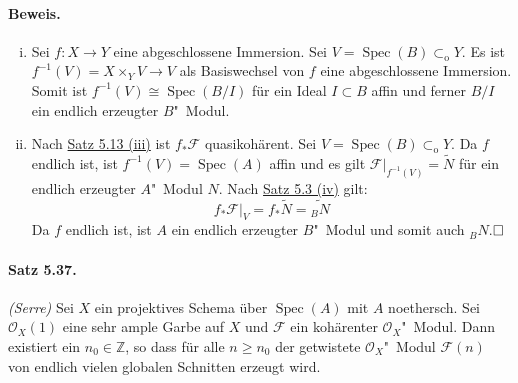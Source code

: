\documentclass[11pt,b5paper,openany]{memoir}
\def \qed {$\hfill\square$}
\begin{document}
\paragraph{Beweis.}\begin{enumerate}[(i)]
\item Sei $f:X\to Y$ eine abgeschlossene Immersion. Sei $V=\operatorname{Spec}(B)\subset_\text{o}Y$. Es ist $f^{-1}(V)=X\times_YV\to V$ als Basiswechsel von $f$ eine abgeschlossene Immersion. Somit ist $f^{-1}(V)\cong\operatorname{Spec}(B/I)$ für ein Ideal $I\subset B$ affin und ferner $B/I$ ein endlich erzeugter $B$"~Modul.
\item Nach \hyperref[5.13]{Satz 5.13 (iii)} ist $f_\ast\mathcal{F}$ quasikohärent. Sei $V=\operatorname{Spec}(B)\subset_\text{o}Y$. Da $f$ endlich ist, ist $f^{-1}(V)=\operatorname{Spec}(A)$ affin und es gilt $\mathcal{F}|_{f^{-1}(V)}=\widetilde{N}$ für ein endlich erzeugter $A$"~Modul $N$. Nach \hyperref[5.3]{Satz 5.3 (iv)} gilt:
\[f_\ast\mathcal{F}|_V = f_\ast\widetilde{N} = \widetilde{_BN} \]
Da $f$ endlich ist, ist $A$ ein endlich erzeugter $B$"~Modul und somit auch $_BN$.\qed
\end{enumerate}

\paragraph{Satz 5.37.}\label{5.37} \textit{(Serre)} Sei $X$ ein projektives Schema über $\operatorname{Spec}(A)$ mit $A$ noethersch. Sei $\mathcal{O}_X(1)$ eine sehr ample Garbe auf $X$ und $\mathcal{F}$ ein kohärenter $\mathcal{O}_X$"~Modul. Dann existiert ein $n_0\in\mathbb{Z}$, so dass für alle $n\geq n_0$ der getwistete $\mathcal{O}_X$"~Modul $\mathcal{F}(n)$ von endlich vielen globalen Schnitten erzeugt wird.
\end{document}
